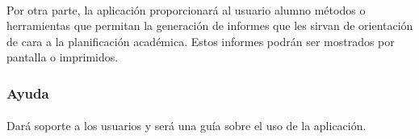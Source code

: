       \paragraph{}Por otra parte, la aplicación proporcionará al usuario alumno
      métodos o herramientas que permitan la generación de informes que les
      sirvan de orientación de cara a la planificación académica. Estos informes
      podrán ser mostrados por pantalla o imprimidos.

      \subsubsection{Ayuda}

      \paragraph{}Dará soporte a los usuarios y será una guía sobre el uso de
      la aplicación.